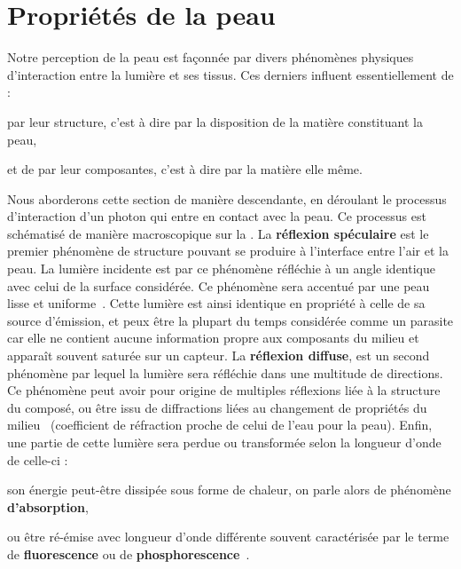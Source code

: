 \section{Propriétés de la peau}
Notre perception de la peau est façonnée par divers phénomènes physiques d'interaction entre la lumière et ses tissus. Ces derniers influent essentiellement de : 
\begin{inlinerate}
\item par leur structure, c'est à dire par la disposition de la matière constituant la peau,
\item et de par leur composantes, c'est à dire par la matière elle même.
\end{inlinerate}
Nous aborderons cette section de manière descendante, en déroulant le processus d'interaction d'un photon qui entre en contact avec la peau. Ce processus est schématisé de manière macroscopique sur la . La \textbf{réflexion spéculaire} est le premier phénomène de structure pouvant se produire à l'interface entre l'air et la peau. La lumière incidente est par ce phénomène réfléchie à un angle identique avec celui de la surface considérée. Ce phénomène sera accentué par une peau lisse et uniforme~\cite{Yang2009}. Cette lumière est ainsi identique en propriété à celle de sa source d'émission, et peux être la plupart du temps considérée comme un parasite car elle ne contient aucune information propre aux composants du milieu et apparaît souvent saturée sur un capteur. La \textbf{réflexion diffuse}, est un second phénomène par lequel la lumière sera réfléchie dans une multitude de directions. Ce phénomène peut avoir pour origine de multiples réflexions liée à la structure du composé, ou être issu de diffractions liées au changement de propriétés du milieu~\cite{Yang2009} (coefficient de réfraction proche de celui de l'eau pour la peau). Enfin, une partie de cette lumière sera perdue ou transformée selon la longueur d'onde de celle-ci :
\begin{inlinerate}
\item son énergie peut-être dissipée sous forme de chaleur, on parle alors de phénomène \textbf{d'absorption},
\item ou être ré-émise avec longueur d'onde différente souvent caractérisée par le terme de \textbf{fluorescence} ou de \textbf{phosphorescence}~\cite{Kollias2002}.
\end{inlinerate}\par

